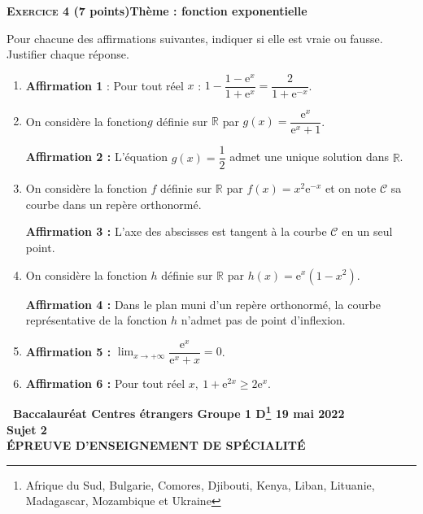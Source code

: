 \documentclass[10pt,a4paper]{article}
\newcommand{\R}{\mathbb{R}}
\begin{document}
\bigskip

\textbf{\textsc{Exercice 4} \quad (7 points)\hfill Thème : fonction exponentielle}

\medskip

Pour chacune des affirmations suivantes, indiquer si elle est vraie ou fausse. Justifier chaque réponse.

\medskip

\begin{enumerate}
\item \textbf{Affirmation 1} : Pour tout réel $x$ : $1 - \dfrac{1 - \text{e}^x}{1 + \text{e}^x} = \dfrac{2}{1 + \text{e}^{-x}}$.
\item On considère la fonction$g$ définie sur $\R$ par $g(x) = \dfrac{\text{e}^x}{\text{e}^x + 1}$.

\textbf{Affirmation 2 : } L'équation $g(x) = \dfrac12$ admet une unique solution dans $\R$.
\item On considère la fonction $f$ définie sur $\R$ par $f(x) = x^2\text{e}^{-x}$ et on note 
$\mathcal{C}$ sa courbe dans un repère orthonormé.

\textbf{Affirmation 3 : } L'axe des abscisses est tangent à la courbe $\mathcal{C}$ en un seul point.
\item On considère la fonction $h$ définie sur $\R$ par $h(x) = \text{e}^x\left(1 -  x^2\right)$.

\textbf{Affirmation 4 :} Dans le plan muni d'un repère orthonormé, la courbe représentative de la fonction $h$ n'admet pas de point d'inflexion.

\item \textbf{Affirmation 5 :} $\displaystyle\lim_{x \to + \infty} \dfrac{\text{e}^x}{\text{e}^x + x} = 0$.

\item \textbf{Affirmation 6 :} Pour tout réel $x,\: 1 + \text{e}^{2x} \geqslant 2\text{e}^x$.
\end{enumerate}

\newpage
\hypertarget{GroupeI2}{}

\label{GroupeI2}

\pagestyle{fancy}
\thispagestyle{empty}

\begin{center}{\Large\textbf{\decofourleft~Baccalauréat Centres étrangers Groupe 1 D\footnote{Afrique du Sud, Bulgarie, Comores, Djibouti, Kenya, Liban, Lituanie, Madagascar, Mozambique et Ukraine} 19 mai 2022~\decofourright\\[7pt]  Sujet 2\\[7pt] ÉPREUVE D'ENSEIGNEMENT DE SPÉCIALITÉ}}
\end{center}
\end{document}
